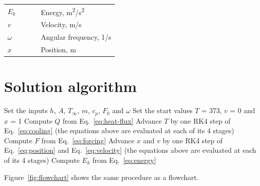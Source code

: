 \documentclass[11pt,a4paper]{article}
\begin{document}
\noindent\begin{tabular}{@{\quad}l@{\quad}p{0.7\linewidth}@{}}
  $E_k$ & Energy, \si{m^{2}/s^{2}} \\
  $v$ & Velocity, \si{m/s} \\
  $\omega$ & Angular frequency, \si{1/s} \\
  $x$ & Position, \si{m} \\
\end{tabular}


\section{Solution algorithm}
\begin{algorithm}[htbp]
  \caption{Solution procedure}\label{alg:solution}
  \begin{algorithmic}[1]
    \State Set the inputs $h$, $A$, $T_\infty$, $m$, $c_p$, $F_0$ and $\omega$
    \State Set the start values $T$ = \num{373}, $v$ = \num{0} and $x$ = \num{1}
     
      \State Compute $\dot{Q}$ from Eq.~\eqref{eq:heat-flux}
      \State Advance $T$ by one RK4 step of Eq.~\eqref{eq:cooling} (the equations above are evaluated at each of its 4 stages)
    \EndFor
     
      \State Compute $F$ from Eq.~\eqref{eq:forcing}
      \State Advance $x$ and $v$ by one RK4 step of Eq.~\eqref{eq:position} and Eq.~\eqref{eq:velocity} (the equations above are evaluated at each of its 4 stages)
    \EndFor
    \State Compute $E_k$ from Eq.~\eqref{eq:energy}
  \end{algorithmic}
\end{algorithm}

Figure~\ref{fig:flowchart} shows the same procedure as a flowchart.
\end{document}
